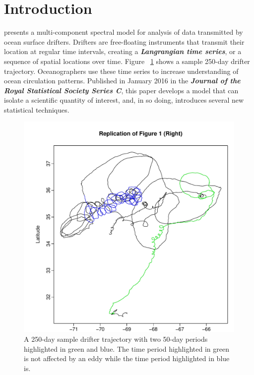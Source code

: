 \documentclass{stat572Style}
\begin{document}
\section{Introduction}
\citet{Sykulski2016} presents a multi-component spectral model for analysis of data transmitted by ocean surface drifters. 
Drifters are free-floating  instruments that transmit their location at regular time intervals,  creating a \textbf{\it{Langrangian time series}}, or a sequence of spatial locations over time. 
Figure ~\ref{fig: fig1} shows a sample 250-day drifter trajectory. 
Oceanographers use these time series to increase understanding of  ocean circulation patterns.
 Published in January 2016 in the \textbf{\it{Journal of the Royal Statistical Society Series C}}, this paper develops a model that can isolate a scientific quantity of interest,  and, in so doing, introduces several new statistical techniques.
 \begin{figure}[h!]
  \centering
    \includegraphics[width=.6\textwidth]{ReplicatedFigures/fig1.pdf}
        \caption{A 250-day sample drifter trajectory with two 50-day periods highlighted in green and blue. The time period highlighted in green is not affected by an eddy while the time period highlighted  in blue is.}
        	\label{fig: fig1}
\end{figure}
 
\end{document}
